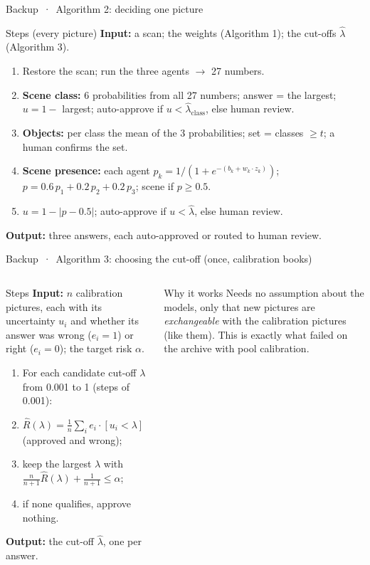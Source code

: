 \documentclass[aspectratio=169,10pt]{beamer}
\begin{document}
\begin{frame}{Backup \,·\, Algorithm 2: deciding one picture}
\begin{defbox}{Steps (every picture)}
\textbf{Input:} a scan; the weights (Algorithm 1); the cut-offs $\hat\lambda$ (Algorithm 3).
\begin{enumerate}\setlength\itemsep{2pt}
\item Restore the scan; run the three agents $\to$ 27 numbers.
\item \textbf{Scene class:} 6 probabilities from all 27 numbers; answer = the largest; $u = 1 - $ largest; auto-approve if $u < \hat\lambda_{\text{class}}$, else human review.
\item \textbf{Objects:} per class the mean of the 3 probabilities; set = classes $\geq t$; a human confirms the set.
\item \textbf{Scene presence:} each agent $p_k = 1 / (1 + e^{-(b_k + w_k\cdot z_k)})$; $p = 0.6\,p_1 + 0.2\,p_2 + 0.2\,p_3$; scene if $p \geq 0.5$.
\item $u = 1 - |p - 0.5|$; auto-approve if $u < \hat\lambda$, else human review.
\end{enumerate}
\textbf{Output:} three answers, each auto-approved or routed to human review.
\end{defbox}
\end{frame}

\begin{frame}{Backup \,·\, Algorithm 3: choosing the cut-off (once, calibration books)}
\begin{columns}[T,onlytextwidth]
\begin{defbox}{Steps}
\textbf{Input:} $n$ calibration pictures, each with its uncertainty $u_i$ and whether its answer was wrong ($e_i = 1$) or right ($e_i = 0$); the target risk $\alpha$.
\begin{enumerate}\setlength\itemsep{2pt}
\item For each candidate cut-off $\lambda$ from 0.001 to 1 (steps of 0.001):
\item \quad $\hat R(\lambda) = \tfrac1n \sum_i e_i \cdot [u_i < \lambda]$ (approved and wrong);
\item keep the largest $\lambda$ with $\tfrac{n}{n+1}\hat R(\lambda) + \tfrac{1}{n+1} \le \alpha$;
\item if none qualifies, approve nothing.
\end{enumerate}
\textbf{Output:} the cut-off $\hat\lambda$, one per answer.
\end{defbox}
\begin{defbox}{Why it works}
Needs no assumption about the models, only that new pictures are \emph{exchangeable} with the calibration pictures (like them). This is exactly what failed on the archive with pool calibration.
\end{defbox}
\end{columns}
\end{frame}
\end{document}
